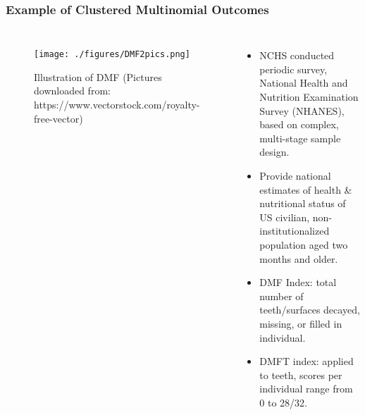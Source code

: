 \documentclass[hyperref={bookmarks=false},aspectratio=169]{beamer}
\begin{document}
\begin{frame}
\frametitle{Example of Clustered Multinomial Outcomes}

\begin{columns}


\begin{figure}
    \centering
    \texttt{[image: ./figures/DMF2pics.png]}
    \caption{Illustration of DMF \newline \tiny{(Pictures downloaded from: https://www.vectorstock.com/royalty-free-vector)}}
    \label{fig:toothDMF2Left}
\end{figure}

\begin{itemize}
    \item NCHS conducted periodic survey, National Health and Nutrition Examination Survey (NHANES), based on complex, multi-stage sample design.
    \item Provide national estimates of health {\&} nutritional status of US civilian, non-institutionalized population aged two months and older.
    \item DMF Index: total number of teeth/surfaces decayed, missing, or filled in individual.
    \item DMFT index: applied to teeth, scores per individual range from 0 to 28/32.
\end{itemize}

\end{columns}
\end{frame}
\end{document}
